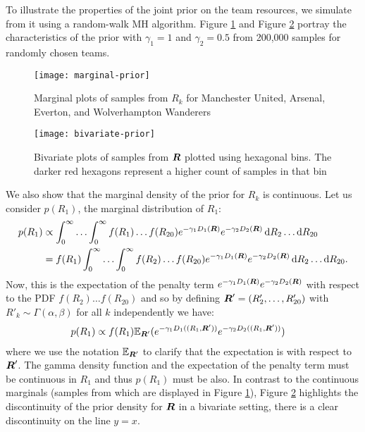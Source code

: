 To illustrate the properties of the joint prior on the team resources, we simulate from it using a random-walk \gls{MH}
algorithm. Figure \ref{fig:marginals} and Figure \ref{fig:bivariate} portray the characteristics of the prior with
\(\gamma_1 = 1\) and \(\gamma_2 = 0.5\) from 200,000 samples for randomly chosen teams.
\begin{figure}[htp]
\begin{center}
\texttt{[image: marginal-prior]}
\caption{Marginal plots of samples from \(R_k\) for Manchester United, Arsenal, Everton, and Wolverhampton Wanderers}
\label{fig:marginals}
\end{center}
\end{figure} 
%
\begin{figure}[htp]
\begin{center}
\texttt{[image: bivariate-prior]}
\caption{Bivariate plots of samples from \(\boldsymbol{R}\) plotted using hexagonal bins. The darker red hexagons represent a
higher count of samples in that bin}
\label{fig:bivariate}
\end{center}
\end{figure}
We also show that the marginal density of the prior for \(R_k\) is continuous. Let us consider \(p(R_1)\), the
marginal distribution of \(R_1\):
\begin{align} 
p(R_1) &\propto \int_0^\infty \ldots \int_0^\infty f(R_1) \ldots f(R_{20}) e^{-\gamma_1 D_1(\boldsymbol{R})} e^{-\gamma_2
D_2(\boldsymbol{R})} \, \mathrm{d}R_2 \ldots\mathrm{d}R_{20} \notag\\
&= f(R_1) \int_0^\infty \ldots \int_0^\infty f(R_2) \ldots f(R_{20}) e^{-\gamma_1 D_1(\boldsymbol{R})} e^{-\gamma_2
D_2(\boldsymbol{R})} \, \mathrm{d}R_2 \ldots\mathrm{d}R_{20}.
\end{align}
Now, this is the expectation of the penalty term \(e^{-\gamma_1 D_1(\boldsymbol{R})} e^{-\gamma_2 D_2(\boldsymbol{R})}\) with respect to
the \gls{PDF} \(f(R_2) \ldots f(R_{20})\) and so by defining \(\boldsymbol{R}' = (R'_2, \ldots, R'_{20})\) with \(R'_k \sim
\Gamma(\alpha, \beta)\) for all \(k\) independently we have:
\begin{align} 
p(R_1) &\propto f(R_1) \mathbb{E}_{\boldsymbol{R}'}(e^{-\gamma_1 D_1((R_1, \boldsymbol{R}'))} e^{-\gamma_2 D_2((R_1, \boldsymbol{R}'))})
\end{align}
where we use the notation \(\mathbb{E}_{\boldsymbol{R}'}\) to clarify that the expectation is with respect to \(\boldsymbol{R}'\). The gamma
density function and the expectation of the penalty term must be continuous in \(R_1\) and thus \(p(R_1)\) must be also.
In contrast to the continuous marginals (samples from which are displayed in Figure \ref{fig:marginals}), Figure
\ref{fig:bivariate} highlights the discontinuity of the prior density for \(\boldsymbol{R}\) in a bivariate setting, there is a
clear discontinuity on the line \(y=x\).

